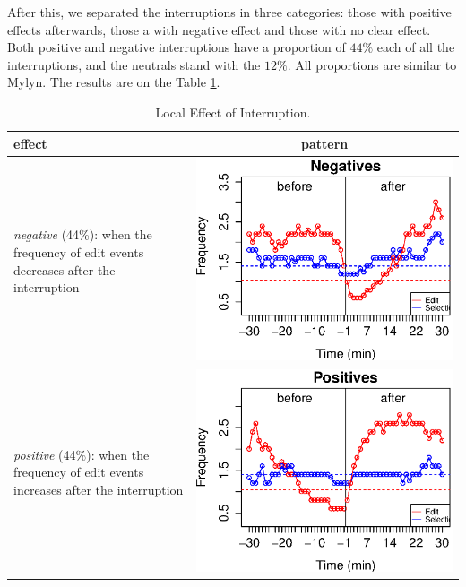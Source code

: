 \documentclass[times]{smrauth}
\begin{document}
After this, we separated the interruptions in three categories: those with positive effects afterwards, those a with negative effect and those with no clear effect. Both positive and negative interruptions have a proportion of $44\%$ each of all the interruptions, and the neutrals stand with the $12\%$. All proportions are similar to Mylyn. The results are on the Table \ref{tbl:local_effect_udc}. 

\begin{table}[ht!]
\caption{Local Effect of Interruption. }
\label{tbl:local_effect_udc}
\centering
\begin{tabular}{p{4cm} | c}
effect & pattern \\
\hline
\textit{negative} (44\%): when the frequency of edit events decreases after the interruption
	& \includegraphics[valign=m,scale=0.3]{figures/udc_neg_ints} \\
\textit{positive} (44\%): when the frequency of edit events increases after the interruption 
	& \includegraphics[valign=m,scale=0.3]{figures/udc_pos_ints} \\

\end{tabular}
\end{table}
\end{document}
